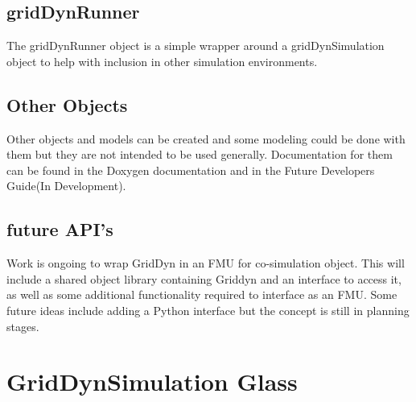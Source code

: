\documentclass[12pt]{article} %
\begin{document}
\subsection{gridDynRunner }
The gridDynRunner object is a simple wrapper around a gridDynSimulation object to help with inclusion in other simulation environments.  

\subsection{Other Objects}
Other objects and models can be created and some modeling could be done with them but they are not intended to be used generally.  Documentation for them can be found in the Doxygen documentation and in the Future Developers Guide(In Development).  
\subsection{future API's}
Work is ongoing to wrap GridDyn in an FMU for co-simulation object.  This will include a shared object library containing Griddyn and an interface to access it, as well as some additional functionality required to interface as an FMU.  Some future ideas include adding a Python interface but the concept is still in planning stages.  

\section{GridDynSimulation Glass}
\end{document}
